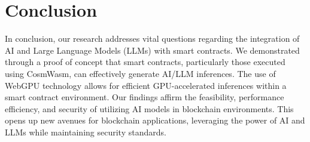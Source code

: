 \section{Conclusion}
In conclusion, our research addresses vital questions regarding the integration of AI and Large Language Models (LLMs) with smart contracts. We demonstrated through a proof of concept that smart contracts, particularly those executed using CosmWasm, can effectively generate AI/LLM inferences. %
The use of WebGPU technology allows for efficient GPU-accelerated inferences within a smart contract environment. Our findings affirm the feasibility, performance efficiency, and security of utilizing AI models in blockchain environments. This opens up new avenues for blockchain applications, leveraging the power of AI and LLMs while maintaining security standards.